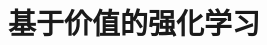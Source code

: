 \setcounter{chapter}{10}

\hypertarget{ux57faux4e8eux4ef7ux503cux7684ux5f3aux5316ux5b66ux4e60}{%
\chapter{基于价值的强化学习}\label{ux57faux4e8eux4ef7ux503cux7684ux5f3aux5316ux5b66ux4e60}}
